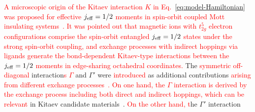 \documentclass[twocolumn,superscriptaddress,showpacs, longbibliography, aps, prb]{revtex4-2}
\def\vec#1{\boldsymbol #1}
\newcommand{\red}[1]{\textcolor{red}{#1}}
\newcommand{\blue}[1]{\textcolor{blue}{#1}}
\newcommand{\orange}[1]{\textcolor{orange}{#1}}
\begin{document}

\red{A microscopic origin of the Kitaev interaction $K$ in Eq.~\eqref{eq:model-Hamiltonian} was proposed for effective $j_{\rm eff}=1/2$ moments in spin-orbit coupled Mott insulating systems~\cite{Jackeli_PRL2009}. 
It was pointed out that magnetic ions with $t_{2g}^5$ electron configurations comprise the spin-orbit entangled $j_{\rm eff}=1/2$ states under the strong spin-orbit coupling, and exchange processes with indirect hoppings via ligands generate the bond-dependent Kitaev-type interactions between the $j_{\rm eff}=1/2$ moments in edge-sharing octahedral coordinates.} 
The \red{symmetric off-diagonal} %
interaction\red{s %
$\Gamma$} and $\Gamma'$ were %
\red{introduced} as additional contributions %
\red{arising from different exchange processes~\cite{Rau2014}.} 
\red{On one hand, the $\Gamma$ interaction is derived by the exchange process including both direct and indirect hoppings, which can be relevant} 
in Kitaev candidate materials~\cite{Yamaji2014,Winter2016,Winter_2017rev}.
\red{On the other hand, %
t}he $\Gamma'$ interaction %
\end{document}
